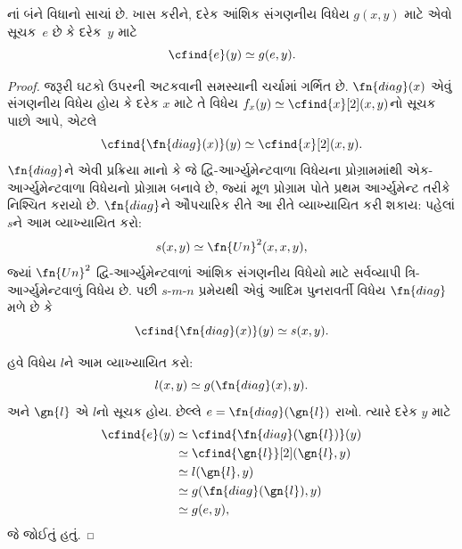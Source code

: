 \begin{thm}
નાં બંને વિધાનો સાચાં છે. ખાસ
કરીને, દરેક આંશિક સંગણનીય વિધેય $g(x,y)$ માટે એવો
સૂચક~$e$ છે કે દરેક~$y$ માટે
\[
\cfind{e}(y) \simeq g(e,y).
\]
\end{thm}

\begin{proof}
જરૂરી ઘટકો ઉપરની અટકવાની સમસ્યાની ચર્ચામાં ગર્ભિત છે.
$\fn{diag}(x)$ એવું સંગણનીય વિધેય હોય કે દરેક $x$ માટે
તે વિધેય $f_x(y) \simeq \cfind{x}[2](x,y)$નો સૂચક
પાછો આપે, એટલે
\[
\cfind{\fn{diag}(x)}(y) \simeq \cfind{x}[2](x,y).
\]
$\fn{diag}$ને એવી પ્રક્રિયા માનો કે જે દ્વિ-આર્ગ્યુમેન્ટવાળા
વિધેયના પ્રોગ્રામમાંથી એક-આર્ગ્યુમેન્ટવાળા વિધેયનો પ્રોગ્રામ
બનાવે છે, જ્યાં મૂળ પ્રોગ્રામ પોતે પ્રથમ આર્ગ્યુમેન્ટ તરીકે
નિશ્ચિત કરાયો છે. $\fn{diag}$ને ઔપચારિક રીતે આ રીતે
વ્યાખ્યાયિત કરી શકાય: પહેલાં $s$ને આમ વ્યાખ્યાયિત કરો:
\[
s(x,y) \simeq \fn{Un}^2(x,x,y),
\]
જ્યાં $\fn{Un}^2$ દ્વિ-આર્ગ્યુમેન્ટવાળાં આંશિક સંગણનીય
વિધેયો માટે સર્વવ્યાપી ત્રિ-આર્ગ્યુમેન્ટવાળું વિધેય છે.
પછી $s$-$m$-$n$ પ્રમેયથી એવું આદિમ પુનરાવર્તી વિધેય
$\fn{diag}$ મળે છે કે
\[
\cfind{\fn{diag}(x)}(y) \simeq s(x,y).
\]

હવે વિધેય $l$ને આમ વ્યાખ્યાયિત કરો:
\[
l(x,y) \simeq g(\fn{diag}(x),y).
\]
અને $\gn{l}$ એ $l$નો સૂચક હોય. છેલ્લે
$e = \fn{diag}(\gn{l})$ રાખો. ત્યારે દરેક $y$ માટે
\begin{align*}
\cfind{e}(y) & \simeq \cfind{\fn{diag}(\gn{l})}(y) \\
& \simeq \cfind{\gn{l}}[2](\gn{l}, y) \\
& \simeq l(\gn{l}, y) \\
& \simeq g(\fn{diag}(\gn{l}),y) \\
& \simeq g(e, y),
\end{align*}
જે જોઈતું હતું.
\end{proof}

